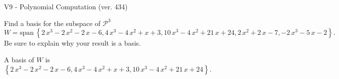 \begin{exercise}
  \begin{exerciseTitle}V9 - Polynomial Computation (ver. 434)\end{exerciseTitle}
  \begin{exerciseStatement}
    Find a basis for the subspace of \(\mathcal{P}^3\) 
\[W=\mathrm{span}\ \left\{2 \, x^{3} - 2 \, x^{2} - 2 \, x - 6 , 4 \, x^{3} - 4 \, x^{2} + x + 3 , 10 \, x^{3} - 4 \, x^{2} + 21 \, x + 24 , 2 \, x^{2} + 2 \, x - 7 , -2 \, x^{3} - 5 \, x - 2\right\}.\]
 Be sure to explain why your result is a basis.


  \end{exerciseStatement}
  \begin{exerciseAnswer}
   A basis of \(W\) is  \(\left\{2 \, x^{3} - 2 \, x^{2} - 2 \, x - 6 , 4 \, x^{3} - 4 \, x^{2} + x + 3 , 10 \, x^{3} - 4 \, x^{2} + 21 \, x + 24\right\}\).
  


  \end{exerciseAnswer}
\end{exercise}